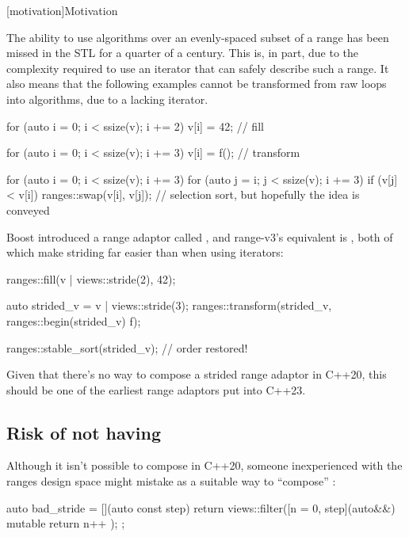 [motivation]{Motivation}

The ability to use algorithms over an evenly-spaced subset of a range has been missed in the STL for
a quarter of a century. This is, in part, due to the complexity required to use an iterator that can
safely describe such a range. It also means that the following examples cannot be transformed from
raw loops into algorithms, due to a lacking iterator.

\begin{codeblock}
for (auto i = 0; i < ssize(v); i += 2) {
  v[i] = 42; // fill
}

for (auto i = 0; i < ssize(v); i += 3) {
  v[i] = f(); // transform
}

for (auto i = 0; i < ssize(v); i += 3) {
  for (auto j = i; j < ssize(v); i += 3) {
    if (v[j] < v[i]) {
      ranges::swap(v[i], v[j]); // selection sort, but hopefully the idea is conveyed
    }
  }
}
\end{codeblock}

Boost introduced a range adaptor called , and range-v3's equivalent is
, both of which make striding far easier than when using iterators:

\begin{codeblock}
ranges::fill(v | views::stride(2), 42);

auto strided_v = v | views::stride(3);
ranges::transform(strided_v, ranges::begin(strided_v) f);

ranges::stable_sort(strided_v); // order restored!
\end{codeblock}

Given that there's no way to compose a strided range adaptor in C++20, this should be one of the
earliest range adaptors put into C++23.

\subsection{Risk of not having }

Although it isn't possible to compose  in C++20, someone inexperienced with the
ranges design space might mistake  as a suitable way to ``compose''
:

\begin{codeblock}
auto bad_stride = [](auto const step) {
  return views::filter([n = 0, step](auto&&) mutable {
    return n++ %
  });
};
\end{codeblock}

